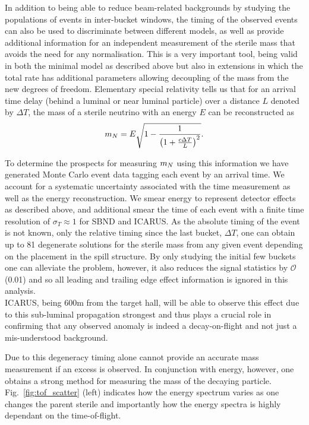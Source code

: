 \documentclass[11pt, a4paper]{article}
\newcommand{\reffig}[1]{Fig.~\ref{#1}}
\def\ster{\ensuremath N}
\begin{document}
In addition to being able to reduce beam-related backgrounds by studying the
populations of events in inter-bucket windows, the timing of the observed
events can also be used to discriminate between different models, as well as
provide additional information for an independent measurement of the sterile
mass that avoids the need for any normalisation. This is a very important tool,
being valid in both the minimal model as described above but also in extensions
in which the total rate has additional parameters allowing decoupling of the
mass from the new degrees of freedom.  Elementary special relativity tells us
that for an arrival time delay (behind a luminal or near luminal particle) over
a distance $L$ denoted by $\Delta T$, the mass of a sterile neutrino with an
energy $E$ can be reconstructed as 
%
\[ m_{\ster} = E\sqrt{1-\frac{1}{\left(1+\frac{c\Delta T}{L}\right)^2}}. \]

To determine the prospects for measuring $m_{\ster}$ using this information we
have generated Monte Carlo event data tagging each event by an arrival time.
We account for a systematic uncertainty associated with the time measurement as
well as the energy reconstruction. We smear energy to represent detector
effects as described above, and additional smear the time of each event with a
finite time resolution of $\sigma_T  \approx 1$ for SBND and ICARUS. As the
absolute timing of the event is not known, only the relative timing since the
last bucket, $\Delta T$, one can obtain up to 81 degenerate solutions for the
sterile mass from any given event depending on the placement in the spill
structure. By only studying the initial few buckets one can alleviate the
problem, however, it also reduces the signal statistics by $\mathcal{O}$(0.01)
and so all leading and trailing edge effect information is ignored in this analysis. \\

ICARUS, being 600m from the target hall, will be able to observe this effect due to this sub-luminal propagation strongest and thus plays a crucial role in confirming that any observed anomaly is indeed a decay-on-flight and not just a mis-understood background.

Due to this degeneracy timing alone cannot provide an accurate mass measurement
if an excess is observed. In conjunction with energy, however, one obtains a
strong method for measuring the mass of the decaying particle.
\reffig{fig:tof_scatter} (left) indicates how the energy spectrum varies as one
changes the parent sterile and importantly how the energy spectra is highly
dependant on the time-of-flight. 
\end{document}

